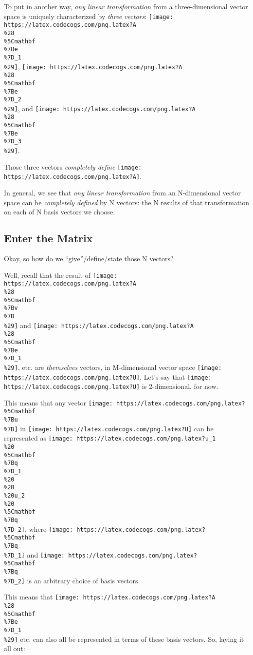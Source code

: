 \documentclass[]{article}
\begin{document}
To put in another way, \emph{any linear transformation} from a three-dimensional
vector space is uniquely characterized by \emph{three vectors}:
\texttt{[image: https://latex.codecogs.com/png.latex?A\\\%28\\\%5Cmathbf\\\%7Be\\\%7D\_1\\\%29]},
\texttt{[image: https://latex.codecogs.com/png.latex?A\\\%28\\\%5Cmathbf\\\%7Be\\\%7D\_2\\\%29]},
and
\texttt{[image: https://latex.codecogs.com/png.latex?A\\\%28\\\%5Cmathbf\\\%7Be\\\%7D\_3\\\%29]}.

Those three vectors \emph{completely define}
\texttt{[image: https://latex.codecogs.com/png.latex?A]}.

In general, we see that \emph{any linear transformation} from an N-dimensional
vector space can be \emph{completely defined} by N vectors: the N results of
that transformation on each of N basis vectors we choose.

\hypertarget{enter-the-matrix}{%
\subsection{Enter the Matrix}\label{enter-the-matrix}}

Okay, so how do we ``give''/define/state those N vectors?

Well, recall that the result of
\texttt{[image: https://latex.codecogs.com/png.latex?A\\\%28\\\%5Cmathbf\\\%7Bv\\\%7D\\\%29]}
and
\texttt{[image: https://latex.codecogs.com/png.latex?A\\\%28\\\%5Cmathbf\\\%7Be\\\%7D\_1\\\%29]},
etc. are \emph{themselves} vectors, in M-dimensional vector space
\texttt{[image: https://latex.codecogs.com/png.latex?U]}. Let's say that
\texttt{[image: https://latex.codecogs.com/png.latex?U]} is 2-dimensional, for
now.

This means that any vector
\texttt{[image: https://latex.codecogs.com/png.latex?\\\%5Cmathbf\\\%7Bu\\\%7D]} in
\texttt{[image: https://latex.codecogs.com/png.latex?U]} can be represented as
\texttt{[image: https://latex.codecogs.com/png.latex?u\_1\\\%20\\\%5Cmathbf\\\%7Bq\\\%7D\_1\\\%20\\\%2B\\\%20u\_2\\\%20\\\%5Cmathbf\\\%7Bq\\\%7D\_2]},
where
\texttt{[image: https://latex.codecogs.com/png.latex?\\\%5Cmathbf\\\%7Bq\\\%7D\_1]} and
\texttt{[image: https://latex.codecogs.com/png.latex?\\\%5Cmathbf\\\%7Bq\\\%7D\_2]} is
an arbitrary choice of basis vectors.

This means that
\texttt{[image: https://latex.codecogs.com/png.latex?A\\\%28\\\%5Cmathbf\\\%7Be\\\%7D\_1\\\%29]}
etc. can also all be represented in terms of these basis vectors. So, laying it
all out:
\end{document}
